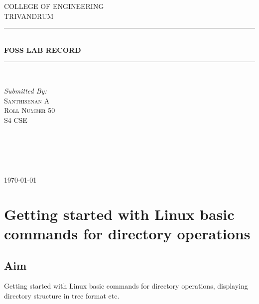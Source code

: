 \documentclass{article}
\begin{document}
\newcommand{\HRule}{\rule{\linewidth}{0.5mm}} 
\begin{titlepage}

\center

\textsc{\LARGE COLLEGE OF ENGINEERING }\\[1.3cm]
\textsc{\Large TRIVANDRUM}\\[0.5cm]

\HRule \\[0.4cm]
{ \huge \bfseries FOSS LAB RECORD}\\[0.4cm] 
\HRule \\[1.5cm]




\begin{minipage}{0.4\textwidth}
\begin{flushleft} \large
\emph{Submitted By:}\\


 \textsc{Santhisenan A \\
 Roll Number 50 \\
 S4 CSE\\
 } 
\end{flushleft}
\end{minipage}
~
\begin{minipage}{0.4\textwidth}
\begin{flushright} \large
\emph{} \\
\end{flushright}
\end{minipage}\\[4cm]


{\large \today}\\[3cm] 


\vfill



\end{titlepage}
\newpage
\tableofcontents{}

\newpage
\section{Getting started with Linux basic commands for directory operations}

\subsection{Aim}
Getting started with Linux basic commands for directory operations, displaying directory structure in tree format etc.
\end{document}
